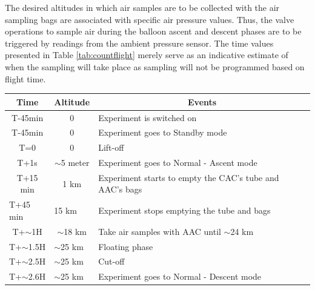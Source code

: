 \documentclass[a4paper,12pt,twoside]{article}
\begin{document}
The desired altitudes in which air samples are to be collected with the air sampling bags are associated with specific air pressure values. Thus, the valve operations to sample air during the balloon ascent and descent phases are to be triggered by readings from the ambient pressure sensor. The time values presented in Table \ref{tab:countflight} merely serve as an indicative estimate of when the sampling will take place as sampling will not be programmed based on flight time.

\begin{table}[H]
\centering


\begin{tabular}{|l|l|l|}
\hline
\multicolumn{1}{|c|}{\textbf{Time}}       & \multicolumn{1}{c|}{\textbf{Altitude}}      & \multicolumn{1}{c|}{\textbf{Events}}                              \\ \hline
\multicolumn{1}{|c|}{T-45min}    & \multicolumn{1}{c|}{0}             & Experiment is switched on                                \\ \hline
\multicolumn{1}{|c|}{T-45min}    & \multicolumn{1}{c|}{0}             & Experiment goes to Standby mode                          \\ \hline
\multicolumn{1}{|c|}{T=0}        & \multicolumn{1}{c|}{0}             & Lift-off                                                 \\ \hline
\multicolumn{1}{|c|}{T+1s}       & \multicolumn{1}{c|}{$\sim$5 meter} & Experiment goes to Normal - Ascent mode                  \\ \hline
\multicolumn{1}{|c|}{T+15 min}   & \multicolumn{1}{c|}{1 km}          & Experiment starts to empty the CAC's tube and AAC's bags \\ \hline
T+45 min                         & 15 km                              & Experiment stops emptying the tube and bags              \\ \hline
\multicolumn{1}{|c|}{T+$\sim$1H} & \multicolumn{1}{c|}{$\sim$18 km}   & Take air samples with AAC until $\sim$24 km                       \\ \hline
T+$\sim$1.5H                     & $\sim$25 km                        & Floating phase                                           \\ \hline
T+$\sim$2.5H                     & $\sim$25 km                        & Cut-off                                                  \\ \hline
T+$\sim$2.6H                     & $\sim$25 km                        & Experiment goes to Normal - Descent mode                 \\ \hline

\end{tabular}
\end{table}
\end{document}
